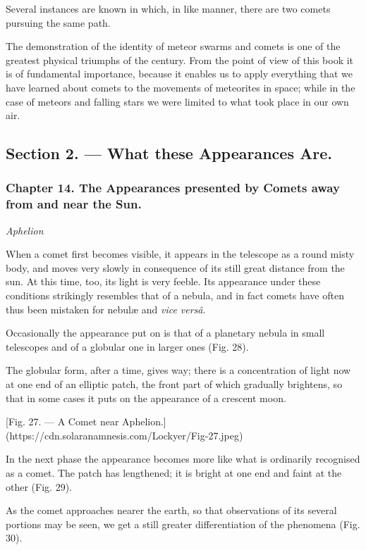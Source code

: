 \documentclass[a4paper, 12pt, oneside, polutonikogreek, english]{article}
\begin{document}
Several instances are known in which, in like manner, there are two comets pursuing the same path.

The demonstration of the identity of meteor swarms and comets is one of the greatest physical triumphs of the century. From the point of view of this book it is of fundamental importance, because it enables us to apply everything that we have learned about comets to the movements of meteorites in space; while in the case of meteors and falling stars we were limited to what took place in our own air.

\subsection{Section 2. --- What these Appearances Are.}

\subsubsection{Chapter 14. The Appearances presented by Comets away from and near the Sun.}

\emph{Aphelion}

When a comet first becomes visible, it appears in the telescope as a round misty body, and moves very slowly in consequence of its still great distance from the sun. At this time, too, its light is very feeble. Its appearance under these conditions strikingly resembles that of a nebula, and in fact comets have often thus been mistaken for nebulæ and \emph{vice versâ}.

Occasionally the appearance put on is that of a planetary nebula in small telescopes and of a globular one in larger ones (Fig. 28).

The globular form, after a time, gives way; there is a concentration of light now at one end of an elliptic patch, the front part of which gradually brightens, so that in some cases it puts on the appearance of a crescent moon.

[Fig. 27. --- A Comet near Aphelion.](https://cdn.solaranamnesis.com/Lockyer/Fig-27.jpeg)

In the next phase the appearance becomes more like what is ordinarily recognised as a comet. The patch has lengthened; it is bright at one end and faint at the other (Fig. 29).

As the comet approaches nearer the earth, so that observations of its several portions may be seen, we get a still greater differentiation of the phenomena (Fig. 30).
\end{document}
